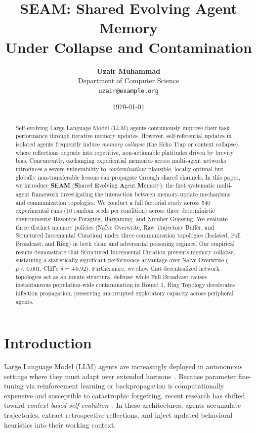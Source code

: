 \documentclass[11pt,a4paper]{article}
\title{\textbf{SEAM: Shared Evolving Agent Memory \\ Under Collapse and Contamination}}
\author{
  \textbf{Uzair Muhammad} \\
  Department of Computer Science \\
  \texttt{uzair@example.org}
}
\date{\today}
\begin{document}
\maketitle

\begin{abstract}
Self-evolving Large Language Model (LLM) agents continuously improve their task performance through iterative memory updates. However, self-referential updates in isolated agents frequently induce \emph{memory collapse} (the Echo Trap or context collapse), where reflections degrade into repetitive, non-actionable platitudes driven by brevity bias. Concurrently, exchanging experiential memories across multi-agent networks introduces a severe vulnerability to \emph{contamination}: plausible, locally optimal but globally non-transferable lessons can propagate through shared channels. In this paper, we introduce \textbf{SEAM} (\textbf{S}hared \textbf{E}volving \textbf{A}gent \textbf{M}emory), the first systematic multi-agent framework investigating the interaction between memory-update mechanisms and communication topologies. We conduct a full factorial study across 540 experimental runs (10 random seeds per condition) across three deterministic environments: Resource Foraging, Bargaining, and Number Guessing. We evaluate three distinct memory policies (Naïve Overwrite, Raw Trajectory Buffer, and Structured Incremental Curation) under three communication topologies (Isolated, Full Broadcast, and Ring) in both clean and adversarial poisoning regimes. Our empirical results demonstrate that Structured Incremental Curation prevents memory collapse, sustaining a statistically significant performance advantage over Naïve Overwrite ($p < 0.001$, Cliff's $\delta = +0.92$). Furthermore, we show that decentralized network topologies act as an innate structural defense: while Full Broadcast causes instantaneous population-wide contamination in Round 1, Ring Topology decelerates infection propagation, preserving uncorrupted exploratory capacity across peripheral agents.
\end{abstract}

\section{Introduction}
\label{sec:intro}

Large Language Model (LLM) agents are increasingly deployed in autonomous settings where they must adapt over extended horizons~\cite{yang2024qwen25}. Because parameter fine-tuning via reinforcement learning or backpropagation is computationally expensive and susceptible to catastrophic forgetting, recent research has shifted toward \emph{context-based self-evolution}~\cite{zhang2026ace,wu2026evolver}. In these architectures, agents accumulate trajectories, extract retrospective reflections, and inject updated behavioral heuristics into their working context.
\end{document}
